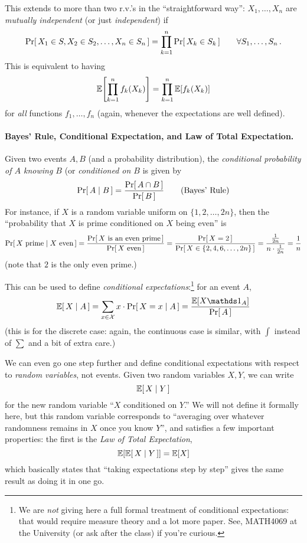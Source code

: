 This extends to more than two r.v.'s in the ``straightforward way'': $X_1,\dots, X_n$ are \emph{mutually independent} (or just \emph{independent}) if 
\[
    \probaOf{X_1 \in S, X_2\in S_2,\dots, X_n \in S_n} = \prod_{k=1}^n\probaOf{X_k\in S_k}\qquad \forall S_1,\dots, S_n\,.
\]
This is equivalent to having
\[
    \expect{\prod_{k=1}^n f_k(X_k)} = \prod_{k=1}^n\expect{f_k(X_k)}
\]
for \emph{all} functions $f_1,\dots, f_n$ (again, whenever the expectations are well defined).

\paragraph{Bayes' Rule, Conditional Expectation, and Law of Total Expectation.} Given two events $A,B$ (and a probability distribution), the \emph{conditional probability of $A$ knowing $B$} (or \emph{conditioned on $B$} is given by
\[
\probaCond{A}{B} = \frac{\probaOf{A \cap B}}{\probaOf{B}} \tag{Bayes' Rule}
\]
For instance, if $X$ is a random variable uniform on $\{1,2,\dots, 2n\}$, then the ``probability that $X$ is prime conditioned on $X$ being even'' is
\[
    \probaCond{X \text{ prime}}{X \text{ even}}
    = \frac{\probaOf{X \text{ is an even prime}}}{\probaOf{X \text{ even}}}
    = \frac{\probaOf{X=2}}{\probaOf{X\in \{2,4,6,\dots, 2n\}}}
    = \frac{\frac{1}{2n}}{n\cdot \frac{1}{2n}}
    = \frac{1}{n}
\]
(note that $2$ is the only even prime.)

This can be used to define \emph{conditional expectations}:\footnote{We are \emph{not} giving here a full formal treatment of conditional expectations: that would require measure theory and a lot more paper. See, \eg MATH4069 at the University (or ask after the class) if you're curious.} for an event $A$,
\[
\expectCond{X}{A}  = \sum_{x\in \domain} x \cdot \probaCond{X=x}{A} = \frac{\expect{X \indicSet{A}}}{\probaOf{A}}
\]
(this is for the discrete case: again, the continuous case is similar, with $\int$ instead of $\sum$ and a bit of extra care.)

We can even go one step further and define conditional expectations with respect to \emph{random variables}, not events. Given two random variables $X,Y$, we can write
\[
    \expectCond{X}{Y}
\]
for the new random variable ``$X$ conditioned on $Y$.'' We will not define it formally here, but this random variable corresponds to ``averaging over whatever randomness remains in $X$ once you know $Y$'', and satisfies a few important properties: the first is the \emph{Law of Total Expectation},
\[
\expect{\expectCond{X}{Y}} = \expect{X}
\]
which basically states that ``taking expectations step by step'' gives the same result as doing it in one go.

